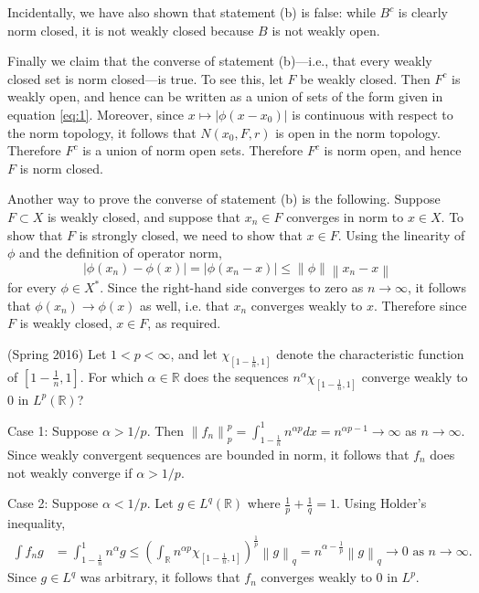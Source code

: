\documentclass[answers]{exam}
\theoremstyle{problemstyle}
\newcommand{\norm}[1]{\left\lVert#1\right\rVert} %
\newcommand{\1}[1]{\textbf{1}_{\left[#1\right]}} %
\def\R{\mathbb{R}} %
\begin{document}
\begin{questions}
\begin{solution}
    Incidentally, we have also shown that statement (b) is false: while $B^c$ is clearly norm closed, it is not weakly closed because $B$ is not weakly open.

    Finally we claim that the converse of statement (b)---i.e., that every weakly closed set is norm closed---is true. To see this, let $F$ be weakly closed. Then $F^c$ is weakly open, and hence can be written as a union of sets of the form given in equation \eqref{eq:1}. Moreover, since $x\mapsto |\phi(x-x_{0})|$ is continuous with respect to the norm topology, it follows that $N(x_{0},F,r)$ is open in the norm topology. Therefore $F^c$ is a union of norm open sets. Therefore $F^c$ is norm open, and hence $F$ is norm closed.

    Another way to prove the converse of statement (b) is the following. Suppose $F\subset X$ is weakly closed, and suppose that $x_{n}\in F$ converges in norm to $x\in X$. To show that $F$ is strongly closed, we need to show that $x\in F$. Using the linearity of $\phi$ and the definition of operator norm,
    \begin{equation*}
      |\phi(x_{n})-\phi(x)| = |\phi(x_{n}-x)|\leq \norm{\phi} \norm{x_{n}-x}
    \end{equation*}
    for every $\phi\in X^{*}$. Since the right-hand side converges to zero as $n\to\infty$, it follows that $\phi(x_{n})\to \phi(x)$ as well, i.e. that $x_{n}$ converges weakly to $x$. Therefore since $F$ is weakly closed, $x\in F$, as required.
\end{solution}


\item (Spring 2016) Let $1<p<\infty$, and let $\chi_{[1-\frac{1}{n},1]}$ denote the characteristic function of $[1-\frac{1}{n},1]$. For which $\alpha\in \R$ does the sequences $n^{\alpha}\chi_{[1-\frac{1}{n},1]}$ converge weakly to $0$ in $L^{p}(\R)$?

\begin{solution}
  Case 1: Suppose $\alpha> 1/p$. Then $\norm{f_{n}}_{p}^{p} = \int_{1-\frac{1}{n}}^{1}n^{\alpha p}dx = n^{\alpha p - 1}\to \infty$ as $n\to\infty$. Since weakly convergent sequences are bounded in norm, it follows that $f_{n}$ does not weakly converge if $\alpha>1/p$.

  Case 2: Suppose $\alpha<1/p$. Let $g\in L^{q}(\R)$ where $\frac{1}{p}+\frac{1}{q}=1$. Using Holder's inequality,
  \begin{align*}
    \int f_{n}g &= \int_{1-\frac{1}{n}}^{1}n^{\alpha} g \leq \left( \int_{\R}n^{\alpha p}\chi_{[1-\frac{1}{n},1]} \right)^{\frac{1}{p}} \norm{g}_{q} = n^{\alpha-\frac{1}{p}}\norm{g}_{q}\to 0 \text{ as }n\to\infty.
  \end{align*}
  Since $g\in L^{q}$ was arbitrary, it follows that $f_{n}$ converges weakly to $0$ in $L^{p}$.


\end{solution}
\end{questions}
\end{document}
